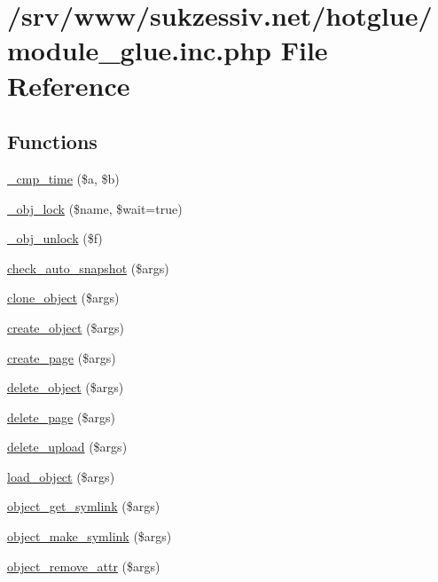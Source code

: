 \hypertarget{module__glue_8inc_8php}{
\section{/srv/www/sukzessiv.net/hotglue/module\_\-glue.inc.php File Reference}
\label{module__glue_8inc_8php}
}
\subsection*{Functions}
\begin{CompactItemize}
\item 
\hyperlink{module__glue_8inc_8php_5fea6c120a24a298149febcbf3b1df10}{\_\-cmp\_\-time} (\$a, \$b)
\item 
\hyperlink{module__glue_8inc_8php_21f260355b875069ca90edf1f9a559d0}{\_\-obj\_\-lock} (\$name, \$wait=true)
\item 
\hyperlink{module__glue_8inc_8php_73a91facde5362e20df9657d31c2bb06}{\_\-obj\_\-unlock} (\$f)
\item 
\hyperlink{module__glue_8inc_8php_aa1103a091b9dbca790e77d25a452ca5}{check\_\-auto\_\-snapshot} (\$args)
\item 
\hyperlink{module__glue_8inc_8php_9c7f39d87787ce288ce3d8a3e389ba95}{clone\_\-object} (\$args)
\item 
\hyperlink{module__glue_8inc_8php_12aa18f28f86274d770ba90aa88e2c3e}{create\_\-object} (\$args)
\item 
\hyperlink{module__glue_8inc_8php_9806cd2a9b829a24876b149753e819fb}{create\_\-page} (\$args)
\item 
\hyperlink{module__glue_8inc_8php_51fdb1d1ff829d6d2d79a9f852b7e0ef}{delete\_\-object} (\$args)
\item 
\hyperlink{module__glue_8inc_8php_f11541a6869804225793b82e54fa09fe}{delete\_\-page} (\$args)
\item 
\hyperlink{module__glue_8inc_8php_a4865d52ac449f8aaadb3a5d425f2efb}{delete\_\-upload} (\$args)
\item 
\hyperlink{module__glue_8inc_8php_c6b5ed5ff055ccb4d07ad17cf78d5a11}{load\_\-object} (\$args)
\item 
\hyperlink{module__glue_8inc_8php_a9618d306b7ee5bd9e5d6a0be268ed44}{object\_\-get\_\-symlink} (\$args)
\item 
\hyperlink{module__glue_8inc_8php_14e6da411df5aa9ff38e2d4ea27dd077}{object\_\-make\_\-symlink} (\$args)
\item 
\hyperlink{module__glue_8inc_8php_e16d748c2d933978daec8bf11acdc34b}{object\_\-remove\_\-attr} (\$args)

\end{CompactItemize}
